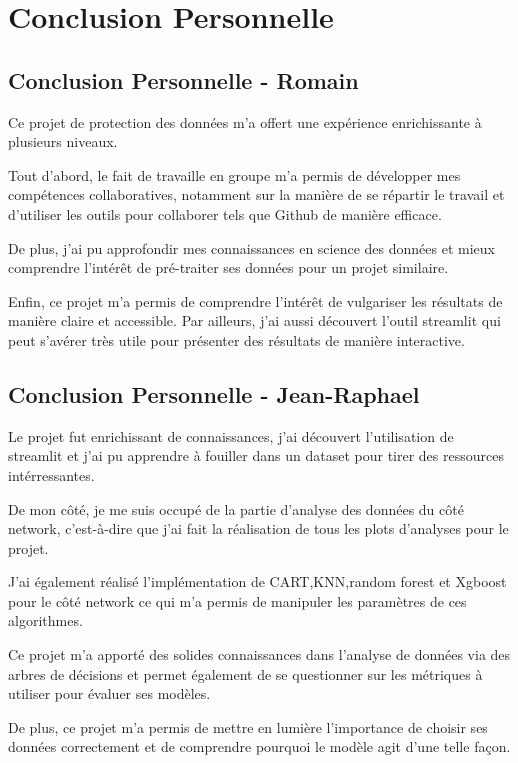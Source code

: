 \section*{Conclusion Personnelle}

\subsection*{Conclusion Personnelle - Romain}

Ce projet de protection des données m’a offert une expérience enrichissante à plusieurs niveaux.

Tout d'abord, le fait de travaille en groupe m’a permis de développer mes compétences collaboratives, notamment sur la manière de se répartir le travail et d'utiliser les outils pour collaborer tels que Github de manière efficace.

De plus, j'ai pu approfondir mes connaissances en science des données et mieux comprendre l'intérêt de pré-traiter ses données pour un projet similaire.

Enfin, ce projet m'a permis de comprendre l'intérêt de vulgariser les résultats de manière claire et accessible. Par ailleurs, j'ai aussi découvert l'outil streamlit qui peut s'avérer très utile pour présenter des résultats de manière interactive.

\subsection*{Conclusion Personnelle - Jean-Raphael}

Le projet fut enrichissant de connaissances, j'ai découvert l'utilisation de streamlit et j'ai pu apprendre à fouiller dans un dataset pour tirer des ressources intérressantes.

De mon côté, je me suis occupé de la partie d'analyse des données du côté network, c'est-à-dire que j'ai fait la réalisation de tous les plots d'analyses pour le projet.

J'ai également réalisé l'implémentation de CART,KNN,random forest et Xgboost pour le côté network ce qui m'a permis de manipuler les paramètres de ces algorithmes.

Ce projet m'a apporté des solides connaissances dans l'analyse de données via des arbres de décisions et permet également de se questionner sur les métriques à utiliser pour évaluer ses modèles.

De plus, ce projet m'a permis de mettre en lumière l'importance de choisir ses données correctement et de comprendre pourquoi le modèle agit d'une telle façon.

